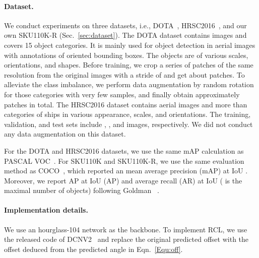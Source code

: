\documentclass[10pt,twocolumn,letterpaper]{article}
\newcommand{\xingjia}[1]{{\color{XingjiaColor}[Xingjia: #1]}}
\newcommand{\nothing}[1]{}
\renewcommand{\xingjia}[1]{}
\renewcommand{\nothing}[1]{}
\begin{document}
\paragraph{Dataset.}
We conduct experiments on three datasets, i.e., DOTA~\cite{xia2018dota}, HRSC2016~\cite{liu2016ship}, and our own SKU110K-R (Sec.~\ref{sec:dataset}).
The DOTA dataset contains  images and covers 15 object categories. It is mainly used for object detection in aerial images with annotations of oriented bounding boxes.
The objects are of various scales, orientations, and shapes.
Before training, we crop a series of patches of the same resolution  from the original images with a stride of \nothing{ using the official development kit} and get about  patches.
To alleviate the class imbalance, we perform data augmentation by random rotation for those categories with very few samples, and finally obtain approximately  patches in total.
The HRSC2016 dataset contains  aerial images and more than  categories of ships in various appearance, scales, and orientations.
The training, validation, and test sets include , , and  images, respectively.
We did not conduct any data augmentation on this dataset.


\nothing{
The benchmark SKU110K is a new dataset containing images of supermarket shelves where the items are in tightly packed and efficient arrangements. \xingjia{describe our re-labeled dataset instead of the original one} The training split consists of  of images ( images) and associated  rotated bounding boxes.  of the images (with their  bounding boxes) are used for validation. The rest,  images ( bounding boxes) are used for testing. We relabel a oriented bounding box for each instance.
}

For the DOTA and HRSC2016 datasets, we use the same mAP calculation as PASCAL VOC~\cite{everingham2010pascal}.
For SKU110K and SKU110K-R, we use the same evaluation method as COCO~\cite{lin2014microsoft}, which reported an mean average precision (mAP) at IoU .
Moreover, we report AP at IoU  (AP) and average recall  (AR) at IoU  ( is the maximal number of objects) following Goldman \etal~\cite{goldman2019precise}.

\paragraph{Implementation details.}
We use an hourglass-104 network as the backbone.
To implement RCL, we use the released code of DCNV2~\cite{zhu2019deformable} and replace the original predicted offset with the offset deduced from the predicted angle in Eqn.~\ref{Equ:off}.
\end{document}
